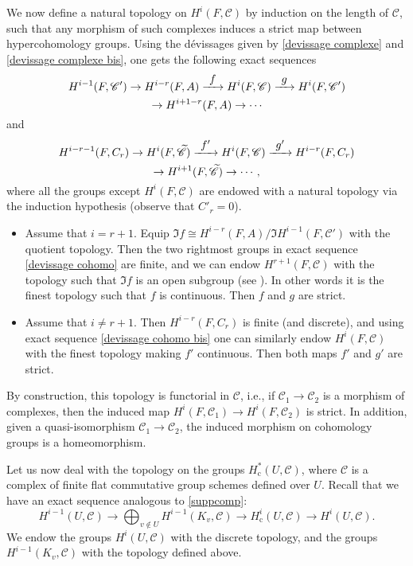 \documentclass[10pt,a4paper]{amsart}
\newcommand{\ie}{i.e.,\xspace}
\let\mathcal\mathscr
\newcommand\To[1]{\mathchoice{\xrightarrow{\textstyle\kern4pt#1\kern3pt}}{\stackrel{#1}{\longrightarrow}}{}{}}
\newcommand{\rc}{\mathrm{c}}
\theoremstyle{plain}
\theoremstyle{definition}
\newcommand \cC {\mathcal{C}}
\begin{document}
We now define a natural topology on $H^i(F, \cC)$ by induction on the length of $\cC$, such that any morphism of such complexes induces a strict map between hypercohomology groups. Using the dévissages given by \eqref{devissage complexe} and \eqref{devissage complexe bis}, one gets the following exact sequences\vspace*{-3pt}
\begin{multline} \label{devissage cohomo}
H^{i-1}(F, \cC') \to H^{i-r}(F,A) \To{f} H^i(F, \cC) \To{g} H^i(F, \cC')\\ \to H^{i+1-r}(F,A) \to \cdots\vspace*{-3pt}
\end{multline}
and\vspace*{-3pt}
\begin{multline} \label{devissage cohomo bis}
H^{i-r-1}(F, C_r) \to H^{i}(F,\widetilde{\cC}) \To{f'} H^i(F, \cC) \To{g'} H^{i-r}(F, C_r)\\ \to H^{i+1}(F,\widetilde{\cC}) \to \cdots,\vspace*{-3pt}
\end{multline}
where all the groups except $H^i(F, \cC)$ are endowed with a
natural topology via the induction hypothesis (observe that $C'_r=0$).
\begin{itemize}
\item Assume that $i = r+1$. Equip $\Im f\cong H^{i-r}(F,A)/
\Im H^{i-1}(F, \cC')$ with the quotient topology.
Then the two rightmost groups in exact sequence \eqref{devissage cohomo} are finite, and we can endow $H^{r+1}(F, \cC)$ with the topology such that
$\Im f$ is an open subgroup (see \cite[beginning of \S 3]{DemH}).
In other words it is the
finest topology such that $f$ is continuous. Then $f$ and $g$ are strict.
\item Assume that $i \neq r+1$. Then $H^{i-r}(F,C_r)$ is finite (and discrete), and using exact sequence \eqref{devissage cohomo bis} one can similarly
endow $H^i(F, \cC)$ with the finest topology making $f'$ continuous. Then both maps $f'$ and $g'$ are strict.
\end{itemize}
By construction, this topology is functorial in $\cC$, \ie if $\cC_1 \to \cC_2$ is a morphism of complexes, then the induced map $H^i(F, \cC_1) \to H^i(F, \cC_2)$ is strict. In addition, given a quasi-isomorphism $\cC_1 \to \cC_2$, the induced morphism on cohomology groups is a homeomorphism.

Let us now deal with the topology on the groups $H^*_\rc(U, \cC)$, where $\cC$ is a complex of finite flat commutative group schemes defined over $U$. Recall that we have an exact sequence analogous to \eqref{suppcomp}:
\begin{equation} \label{long exact seq compact supp}
H^{i-1}(U,\cC) \to \bigoplus_{v \notin U} H^{i-1}(K_v,\cC) \to H^{i}_\rc(U,\cC) \to H^{i}(U,\cC).
\end{equation}
We endow the groups $H^{i}(U,\!\cC)$ with the discrete topology, and the groups~$H^{i-1}(K_v,\!\cC)$ with the topology defined above.
\end{document}
